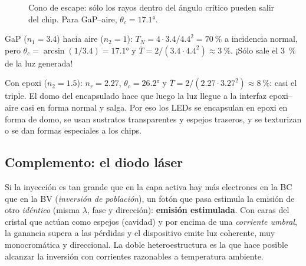 \begin{figure}[H]
\centering
{}
\caption{Cono de escape: sólo los rayos dentro del ángulo crítico pueden salir del chip.
Para GaP--aire, $\theta_c=\ang{17.1}$.}
\label{fig:cono}
\end{figure}

\begin{ejemplo}
GaP ($n_1=3.4$) hacia aire ($n_2=1$): $T_N=4\cdot3.4/4.4^2=\SI{70}{\percent}$ a incidencia
normal, pero $\theta_c=\arcsin(1/3.4)=\ang{17.1}$ y $\overline{T}=2/(3.4\cdot4.4^2)
\approx\SI{3}{\percent}$. ¡Sólo sale el \SI{3}{\percent} de la luz generada!

Con epoxi ($n_2=1.5$): $n_r=2.27$, $\theta_c=\ang{26.2}$ y
$\overline{T}=2/(2.27\cdot3.27^2)\approx\SI{8}{\percent}$: casi el triple. El domo del
encapsulado hace que luego la luz llegue a la interfaz epoxi--aire casi en forma normal y
salga. Por eso los LEDs se encapsulan en epoxi en forma de domo, se usan sustratos
transparentes y espejos traseros, y se texturizan o se dan formas especiales a los chips.
\end{ejemplo}

\subsection{Complemento: el diodo láser}

Si la inyección es tan grande que en la capa activa hay más electrones en la BC que en la
BV (\emph{inversión de población}), un fotón que pasa estimula la emisión de otro
\emph{idéntico} (misma $\lambda$, fase y dirección): \textbf{emisión estimulada}. Con caras
del cristal que actúan como espejos (cavidad) y por encima de una \emph{corriente umbral},
la ganancia supera a las pérdidas y el dispositivo emite luz coherente, muy
monocromática y direccional. La doble heteroestructura es la que hace posible alcanzar la
inversión con corrientes razonables a temperatura ambiente.
